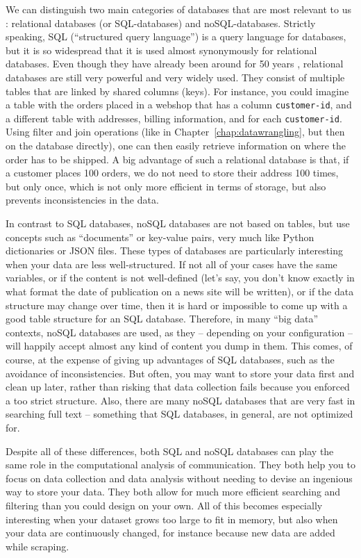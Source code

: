 We can distinguish two main categories of databases
that are most relevant to us \citep[see also][]{Gunther2018}:
relational databases (or SQL-databases) and noSQL-databases. Strictly
speaking, SQL (``structured query language'') is a query language for
databases, but it is so widespread that it is used almost synonymously
for relational databases. Even though they have already been around for
 50 years \citep{Codd1970}, relational databases are still  very
powerful and very widely used.  They consist of multiple tables that
are linked by shared columns (keys). For instance, you could imagine a
table with the orders placed in a webshop that has a column
\verb|customer-id|, and a different table with addresses, billing
information, and for each \verb|customer-id|. Using filter and join
operations (like in Chapter~\ref{chap:datawrangling}, but then on the database directly), one can then easily retrieve
information on where the order has to be shipped. A big advantage of
such a relational database is that, if a customer places 100 orders,
we do not need to store their address 100 times, but only once, which
is not only more efficient in terms of storage, but also prevents
inconsistencies in the data.

In contrast to SQL databases, noSQL databases are not based on tables,
but use concepts such as ``documents'' or key-value pairs, very much
like Python dictionaries or JSON files. These types of databases are
particularly interesting when your data are less well-structured. If
not all of your cases have the same variables, or if the content is not
well-defined (let's say, you don't know exactly in what format the date
of publication on a news site will be written), or if the data structure
may change over time, then it is hard or impossible to come up with a
good table structure for an SQL database. Therefore, in many ``big data''
contexts, noSQL databases are used, as they -- depending on your
configuration -- will happily accept almost any kind of content you dump
in them. This comes, of course, at the expense of giving up advantages
of SQL databases, such as the avoidance of inconsistencies. But often,
you may  want to store your data first and clean up later, rather
than risking that data collection fails because you enforced a too strict
structure. Also, there are many noSQL databases that are very fast in
searching full text -- something that SQL databases, in general, are
not optimized for.

Despite all of these differences, both SQL and noSQL databases can play
the same role in the computational analysis of communication. They both
help you to focus on data collection and data analysis without needing
to devise an ingenious way to store your data. They both allow for much
more efficient searching and filtering than you could design on your own.
All of this becomes especially interesting when your dataset grows too
large to fit in memory, but also when your data are continuously changed,
for instance because new data are added while scraping.


